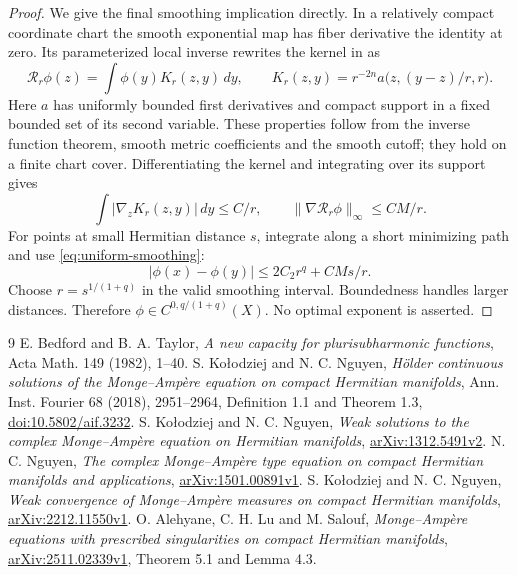 \documentclass[11pt]{article}
\begin{document}
\begin{proof}
We give the final smoothing implication directly. In a relatively
compact coordinate chart the smooth exponential map has fiber derivative
the identity at zero. Its parameterized local inverse rewrites the
kernel in \cite[(2.7)--(2.8)]{KN} as
\[
 \mathcal R_r\phi(z)=\int\phi(y)K_r(z,y)\,dy,\qquad
 K_r(z,y)=r^{-2n}a\bigl(z,(y-z)/r,r\bigr).
\]
Here $a$ has uniformly bounded first derivatives and compact support in
a fixed bounded set of its second variable. These properties follow
from the inverse function theorem, smooth metric coefficients and
the smooth cutoff; they hold on a finite chart cover. Differentiating
the kernel and integrating over its support gives
\[
 \int|\nabla_zK_r(z,y)|\,dy\leq C/r,
 \qquad\|\nabla\mathcal R_r\phi\|_\infty\leq CM/r.
\]
For points at small Hermitian distance $s$, integrate along a short
minimizing path and use \eqref{eq:uniform-smoothing}:
\[
 |\phi(x)-\phi(y)|\leq2C_2r^q+CMs/r.
\]
Choose $r=s^{1/(1+q)}$ in the valid smoothing interval. Boundedness
handles larger distances. Therefore $\phi\in C^{0,q/(1+q)}(X)$.
No optimal exponent is asserted.
\end{proof}

\begin{thebibliography}{9}
 E. Bedford and B. A. Taylor,
\emph{A new capacity for plurisubharmonic functions}, Acta Math.
149 (1982), 1--40.
 S. Ko\l odziej and N. C. Nguyen,
\emph{H\"older continuous solutions of the Monge--Amp\`ere equation
on compact Hermitian manifolds}, Ann. Inst. Fourier 68 (2018),
2951--2964, Definition 1.1 and Theorem 1.3,
\href{https://aif.centre-mersenne.org/item/10.5802/aif.3232.pdf}
{doi:10.5802/aif.3232}.
 S. Ko\l odziej and N. C. Nguyen,
\emph{Weak solutions to the complex Monge--Amp\`ere equation on
Hermitian manifolds}, \href{https://arxiv.org/abs/1312.5491v2}
{arXiv:1312.5491v2}.
 N. C. Nguyen,
\emph{The complex Monge--Amp\`ere type equation on compact Hermitian
manifolds and applications}, \href{https://arxiv.org/abs/1501.00891v1}
{arXiv:1501.00891v1}.
 S. Ko\l odziej and N. C. Nguyen,
\emph{Weak convergence of Monge--Amp\`ere measures on compact Hermitian
manifolds}, \href{https://arxiv.org/abs/2212.11550v1}
{arXiv:2212.11550v1}.
 O. Alehyane, C. H. Lu and M. Salouf,
\emph{Monge--Amp\`ere equations with prescribed singularities on compact
Hermitian manifolds}, \href{https://arxiv.org/abs/2511.02339v1}
{arXiv:2511.02339v1}, Theorem 5.1 and Lemma 4.3.
\end{thebibliography}
\end{document}
